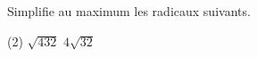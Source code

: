 %
%
    Simplifie au maximum les radicaux suivants.
    \begin{tasks}(2)
        \task \(\sqrt{432}\)
        \task \(4\sqrt{32}\)
    \end{tasks}
